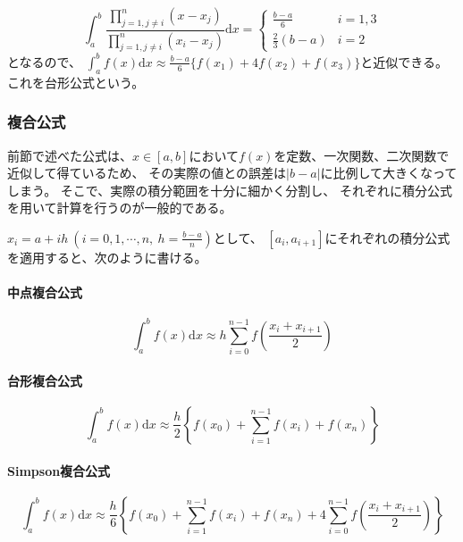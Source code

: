 \documentclass[a4j, titlepage]{jsarticle}
\numberwithin{equation}{section}
\begin{document}
                \begin{equation*}
                    \int_a^b\frac{\displaystyle\prod_{j=1,j\neq i}^n (x-x_j)}{\displaystyle\prod_{j=1,j\neq i}^n (x_i-x_j)}\mathrm{d}x=\begin{cases}
                        \displaystyle\frac{b-a}{6} & i=1,3 \\
                        \displaystyle\frac{2}{3}(b-a) & i=2
                    \end{cases}
                \end{equation*}
                となるので、
                $\displaystyle\int_a^bf(x)\mathrm{d}x\approx\frac{b-a}{6}\{f(x_1)+4f(x_2)+f(x_3)\}$と近似できる。
                これを台形公式という。

        \subsubsection{複合公式}
            前節で述べた公式は、$x\in[a,b]$において$f(x)$を定数、一次関数、二次関数で近似して得ているため、
            その実際の値との誤差は$|b-a|$に比例して大きくなってしまう。
            そこで、実際の積分範囲を十分に細かく分割し、
            それぞれに積分公式を用いて計算を行うのが一般的である。
            
            $x_i=a+ih \ \left(i=0,1,\cdots,n, \ \displaystyle h=\frac{b-a}{n}\right)$として、
            $[a_i,a_{i+1}]$にそれぞれの積分公式を適用すると、次のように書ける。

            \paragraph{中点複合公式}
                \begin{equation}
                    \int_a^bf(x)\mathrm{d}x\approx h\sum_{i=0}^{n-1}f\left(\frac{x_i+x_{i+1}}{2}\right) \label{equ:midpoint}
                \end{equation}

            \paragraph{台形複合公式}
                \begin{equation}
                    \int_a^bf(x)\mathrm{d}x\approx\frac{h}{2}\left\{f(x_0) + \sum_{i=1}^{n-1}f(x_i) + f(x_n)\right\} \label{equ:trapezoid}
                \end{equation}

            \paragraph{Simpson複合公式}
                \begin{equation}
                    \int_a^bf(x)\mathrm{d}x\approx\frac{h}{6}\left\{f(x_0) + \sum_{i=1}^{n-1}f(x_i) + f(x_n) + 4\sum_{i=0}^{n-1}f\left(\frac{x_i+x_{i+1}}{2}\right)\right\} \label{equ:simpson}
                \end{equation}
\end{document}
